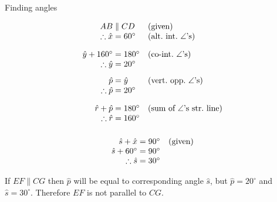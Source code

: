 \begin{wex}{Finding angles}
{\begin{center}
{}
 \end{center}
} 
{

\begin{equation*}
  \begin{array}{r@{\;}l@{\quad}l}
    AB  &\parallel CD & \mbox{(given)} \\
    \therefore \hat{x} &=60^{\circ}   & \mbox{(alt.\ int.\ $\angle$'s)}  \vspace{10pt} \\
    \hat{y} + 160^\circ &= 180^{\circ} & \mbox{(co-int.\ $\angle$'s)} \\
    \therefore \hat{y} &= 20^{\circ}  & \vspace{8pt}\\

    \hat{p} &= \hat{y}    & \mbox{(vert.\ opp.\ $\angle$'s)} \\
    \therefore \hat{p} &= 20^{\circ}  &  \vspace{10pt}\\
    \hat{r} + \hat{p} &= 180^{\circ} &\mbox{(sum of $\angle$'s str.\ line)} \\
    \therefore \hat{r} &= 160^{\circ} &  \vspace{10pt}\\
  \end{array}
\end{equation*}
\begin{equation*}
  \begin{array}{r@{\;}l@{\quad}l}
    \hat{s} + \hat{x} &= 90^{\circ}  & \mbox{(given)} \\ 
    \hat{s} + 60^\circ &= 90^{\circ} & \\
    \therefore \hat{s} &= 30^{\circ} &  
  \end{array}
\end{equation*} 

If $EF \parallel CG$ then $\hat{p}$ will be equal to corresponding
angle $\hat{s}$, but $\hat{p} = 20^{\circ}$ and $\hat{s} = 30^{\circ}$.
Therefore $EF$ is not parallel to $CG$.
}
\end{wex}


